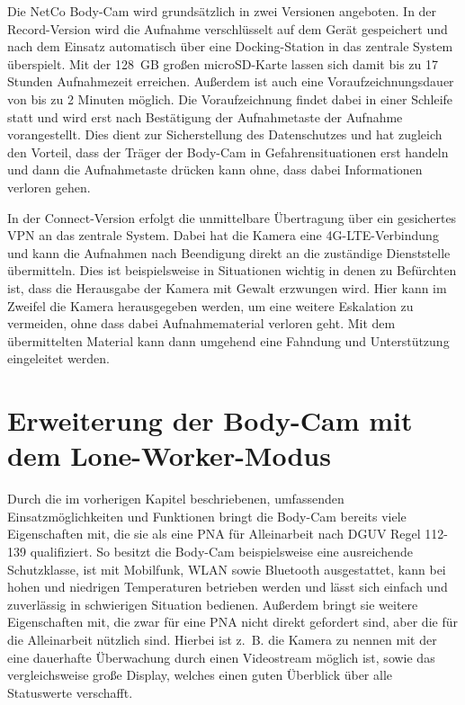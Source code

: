 \documentclass[thesis.tex]{subfiles}
\begin{document}
Die NetCo Body-Cam wird grundsätzlich in zwei Versionen angeboten.
In der Record-Version wird die Aufnahme verschlüsselt auf dem Gerät gespeichert und nach dem Einsatz automatisch über eine Docking-Station in das zentrale System überspielt.
Mit der 128~GB großen microSD-Karte lassen sich damit bis zu 17 Stunden Aufnahmezeit erreichen.
Außerdem ist auch eine Voraufzeichnungsdauer von bis zu 2 Minuten möglich.
Die Voraufzeichnung findet dabei in einer Schleife statt und wird erst nach Bestätigung der Aufnahmetaste der Aufnahme vorangestellt.
Dies dient zur Sicherstellung des Datenschutzes und hat zugleich den Vorteil, dass der Träger der Body-Cam in Gefahrensituationen erst handeln und dann die Aufnahmetaste drücken kann ohne, dass dabei Informationen verloren gehen.

In der Connect-Version erfolgt die unmittelbare Übertragung über ein gesichertes VPN an das zentrale System.
Dabei hat die Kamera eine 4G-LTE-Verbindung und kann die Aufnahmen nach Beendigung direkt an die zuständige Dienststelle übermitteln.
Dies ist beispielsweise in Situationen wichtig in denen zu Befürchten ist, dass die Herausgabe der Kamera mit Gewalt erzwungen wird.
Hier kann im Zweifel die Kamera herausgegeben werden, um eine weitere Eskalation zu vermeiden, ohne dass dabei Aufnahmematerial verloren geht.
Mit dem übermittelten Material kann dann umgehend eine Fahndung und Unterstützung eingeleitet werden.

\section{Erweiterung der Body-Cam mit dem Lone-Worker-Modus}\label{chap:erweiterung}

Durch die im vorherigen Kapitel beschriebenen, umfassenden Einsatzmöglichkeiten und Funktionen bringt die Body-Cam bereits viele Eigenschaften mit, die sie als eine PNA für Alleinarbeit nach DGUV Regel 112-139 \cite[][]{Regel_112-139} qualifiziert.
So besitzt die Body-Cam beispielsweise eine ausreichende Schutzklasse, ist mit Mobilfunk, WLAN sowie Bluetooth ausgestattet, kann bei hohen und niedrigen Temperaturen betrieben werden und lässt sich einfach und zuverlässig in schwierigen Situation bedienen.
Außerdem bringt sie weitere Eigenschaften mit, die zwar für eine PNA nicht direkt gefordert sind, aber die für die Alleinarbeit nützlich sind.
Hierbei ist z.~B. die Kamera zu nennen mit der eine dauerhafte Überwachung durch einen Videostream möglich ist, sowie das vergleichsweise große Display, welches einen guten Überblick über alle Statuswerte verschafft.
\end{document}
